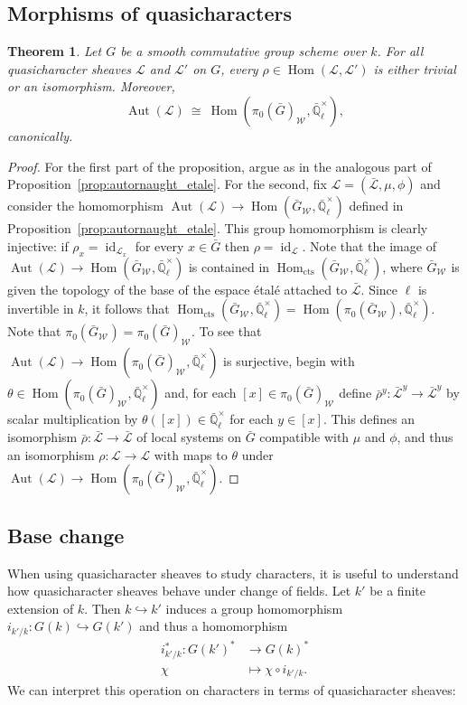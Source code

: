 \documentclass{amsart}
\theoremstyle{plain}
\newtheorem{theorem}{Theorem}[section]
\theoremstyle{definition}
\theoremstyle{remark}
\newcommand{\EE}{\mathbb{\bar Q}_\ell}
\newcommand{\Fq}{k}
\newcommand{\EEx}{\EE^\times}
\newcommand{\Weil}[1]{\mathcal{W}_{#1}}
\DeclareMathOperator{\Aut}{Aut}
\DeclareMathOperator{\Hom}{Hom}
\DeclareMathOperator{\id}{id}
\newcommand{\iso}{{\ \cong\ }}
\newcommand{\qcs}[1]{{\mathcal{#1}}}
\newcommand{\gqcs}[1]{{\mathcal{\bar #1}}}
\newcommand{\bG}{\bar{G}}
\begin{document}
\subsection{Morphisms of quasicharacters}

\begin{theorem}\label{thm:autornaught}
Let $G$ be a smooth commutative group scheme over $\Fq$.
For all quasicharacter sheaves $\qcs{L}$ and $\qcs{L}'$ on $G$,
every $\rho \in \Hom(\qcs{L},\qcs{L}')$ is either trivial or an isomorphism.
Moreover, 
\[
\Aut(\qcs{L}) \iso \Hom(\pi_0(\bG)_{\Weil{}},\EEx),
\]
 canonically.
\end{theorem}
\begin{proof} 
For the first part of the proposition, argue as in the analogous part of Proposition~\ref{prop:autornaught_etale}.
For the second, fix $\qcs{L} = (\gqcs{L},\mu,\phi)$ and consider the homomorphism $\Aut(\qcs{L}) \to \Hom(\bG_{\Weil{}},\EEx)$ defined in Proposition~\ref{prop:autornaught_etale}.
This group homomorphism is clearly injective: if $\rho_x = \id_{\qcs{L}_x}$ for every $x\in \bG$ then $\rho = \id_{\qcs{L}}$.
Note that the image of $\Aut(\qcs{L}) \to \Hom(\bG_{\Weil{}},\EEx)$ is contained in $\Hom_\text{cts}(\bG_{\Weil{}},\EEx)$, where $\bG_{\Weil{}}$ is given the topology of the base of the espace étalé attached to $\gqcs{L}$.
Since $\ell$ is invertible in $\Fq$, it follows that $\Hom_\text{cts}(\bG_{\Weil{}},\EEx) = \Hom(\pi_0(\bG_{\Weil{}}),\EEx)$. 
Note that $\pi_0(\bG_{\Weil{}})=\pi_0(\bG)_{\Weil{}}$. 
To see that $\Aut(\qcs{L}) \to \Hom(\pi_0(\bG)_{\Weil{}},\EEx)$ is surjective, begin with $\theta\in\Hom(\pi_0(\bG)_{\Weil{}},\EEx)$ and, for each $[x] \in \pi_0(\bG)_{\Weil{}}$ define $\bar\rho^y: \gqcs{L}^y \to \gqcs{L}^y$ by scalar multiplication by $\theta([x])\in \EEx$ for each $y\in [x]$.
This defines an isomorphism $\bar\rho : \gqcs{L}\to \gqcs{L}$ of local systems on $\bG$ compatible with $\mu$ and $\phi$, and thus an isomorphism $\rho :\qcs{L}\to \qcs{L}$ with maps to $\theta$ under $\Aut(\qcs{L}) \to \Hom(\pi_0(\bG)_{\Weil{}},\EEx)$.
\end{proof}

\subsection{Base change}\label{sec:basechange}

When using quasicharacter sheaves to study characters, it is useful to understand
how quasicharacter sheaves behave under change of fields.
Let $k'$ be a finite extension of $k$. Then $k \hookrightarrow k'$ induces a group homomorphism
$i_{k'/k} : G(k) \hookrightarrow G(k')$ and thus a homomorphism
\begin{align*}
i_{k'/k}^* : G(k')^* &\to G(k)^* \\
\chi &\mapsto \chi\circ i_{k'/k}.
\end{align*}
We can interpret this operation on characters in terms of quasicharacter sheaves:
\end{document}
